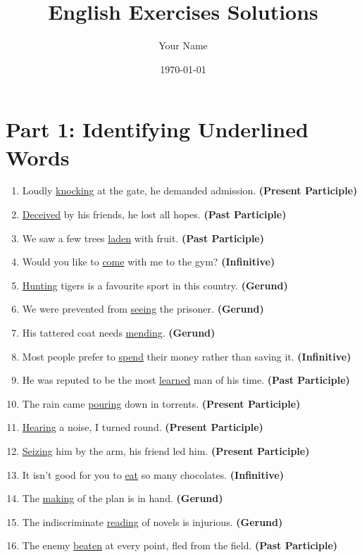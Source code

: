 \documentclass{article}
\begin{document}
\title{English Exercises Solutions}
\author{Your Name}
\date{\today}
\maketitle

\section*{Part 1: Identifying Underlined Words}

\begin{enumerate}
    \item Loudly \underline{knocking} at the gate, he demanded admission. \textbf{(Present Participle)}
    \item \underline{Deceived} by his friends, he lost all hopes. \textbf{(Past Participle)}
    \item We saw a few trees \underline{laden} with fruit. \textbf{(Past Participle)}
    \item Would you like to \underline{come} with me to the gym? \textbf{(Infinitive)}
    \item \underline{Hunting} tigers is a favourite sport in this country. \textbf{(Gerund)}
    \item We were prevented from \underline{seeing} the prisoner. \textbf{(Gerund)}
    \item His tattered coat needs \underline{mending}. \textbf{(Gerund)}
    \item Most people prefer to \underline{spend} their money rather than saving it. \textbf{(Infinitive)}
    \item He was reputed to be the most \underline{learned} man of his time. \textbf{(Past Participle)}
    \item The rain came \underline{pouring} down in torrents. \textbf{(Present Participle)}
    \item \underline{Hearing} a noise, I turned round. \textbf{(Present Participle)}
    \item \underline{Seizing} him by the arm, his friend led him. \textbf{(Present Participle)}
    \item It isn't good for you to \underline{eat} so many chocolates. \textbf{(Infinitive)}
    \item The \underline{making} of the plan is in hand. \textbf{(Gerund)}
    \item The indiscriminate \underline{reading} of novels is injurious. \textbf{(Gerund)}
    \item The enemy \underline{beaten} at every point, fled from the field. \textbf{(Past Participle)}

\end{enumerate}
\end{document}
